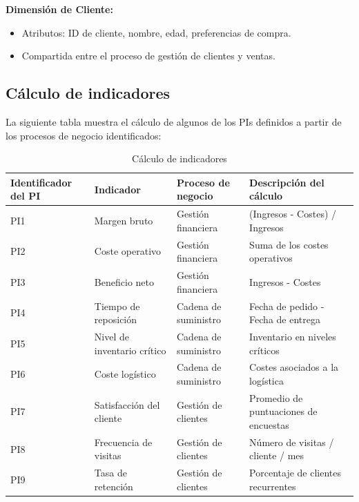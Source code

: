 \documentclass[12pt]{opticajnl}
\begin{document}
\textbf{Dimensión de Cliente:} 
\begin{itemize}
    \item Atributos: ID de cliente, nombre, edad, preferencias de compra.
    \item Compartida entre el proceso de gestión de clientes y ventas.
\end{itemize}

\subsection{Cálculo de indicadores}

La siguiente tabla muestra el cálculo de algunos de los PIs definidos a partir de los procesos de negocio identificados:

\begin{table}[H]
\centering
\begin{tabular}{|p{2cm}|p{4cm}|p{4cm}|p{7cm}|}
\hline
\textbf{Identificador del PI} & \textbf{Indicador} & \textbf{Proceso de negocio} & \textbf{Descripción del cálculo} \\ \hline
PI1                          & Margen bruto       & Gestión financiera          & (Ingresos - Costes) / Ingresos \\ \hline
PI2                          & Coste operativo    & Gestión financiera          & Suma de los costes operativos \\ \hline
PI3                          & Beneficio neto     & Gestión financiera          & Ingresos - Costes \\ \hline
PI4                          & Tiempo de reposición & Cadena de suministro       & Fecha de pedido - Fecha de entrega \\ \hline
PI5                          & Nivel de inventario crítico & Cadena de suministro & Inventario en niveles críticos \\ \hline
PI6                          & Coste logístico    & Cadena de suministro        & Costes asociados a la logística \\ \hline
PI7                          & Satisfacción del cliente & Gestión de clientes     & Promedio de puntuaciones de encuestas \\ \hline
PI8                          & Frecuencia de visitas & Gestión de clientes       & Número de visitas / cliente / mes \\ \hline
PI9                          & Tasa de retención  & Gestión de clientes         & Porcentaje de clientes recurrentes \\ \hline
\end{tabular}
\caption{Cálculo de indicadores}
\end{table}
\end{document}
